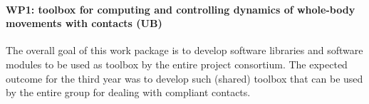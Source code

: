 \paragraph{WP1: toolbox for computing and controlling dynamics of whole-body
  movements with contacts (UB)}

The overall goal of this work package is to develop software libraries and
software modules to be used as toolbox by the entire project consortium.  The
expected outcome for the third year was to develop such (shared) toolbox that
can be used by the entire group for dealing with compliant contacts.

